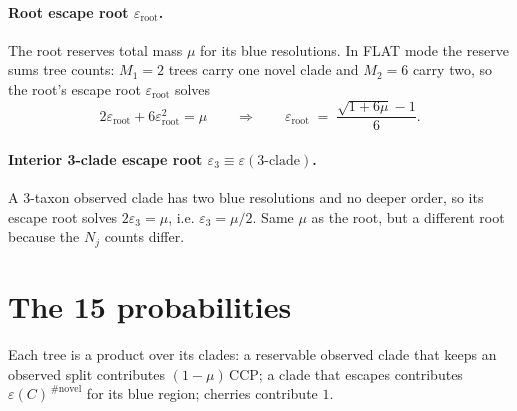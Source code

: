 \documentclass[11pt]{article}
\newcommand{\eroot}{\varepsilon_{\mathrm{root}}}
\begin{document}
\paragraph{Root escape root $\eroot$.}
The root reserves total mass $\mu$ for its blue resolutions. In FLAT mode the
reserve sums tree counts: $M_1=2$ trees carry one novel clade and $M_2=6$ carry
two, so the root's escape root $\eroot$ solves
\[
2\eroot + 6\eroot^2 = \mu
\qquad\Longrightarrow\qquad
\eroot \;=\; \frac{\sqrt{1+6\mu}-1}{6}.
\]

\paragraph{Interior 3-clade escape root $\varepsilon_3\equiv\varepsilon(\text{3-clade})$.}
A 3-taxon observed clade has two blue resolutions and no deeper order, so its
escape root solves $2\varepsilon_3=\mu$, i.e. $\varepsilon_3=\mu/2$. Same $\mu$ as
the root, but a different root because the $N_j$ counts differ.

\section*{The 15 probabilities}

Each tree is a product over its clades: a reservable observed clade that keeps an
observed split contributes $(1-\mu)\,\mathrm{CCP}$; a clade that escapes
contributes $\varepsilon(C)^{\,\#\text{novel}}$ for its blue region; cherries
contribute $1$.
\end{document}
